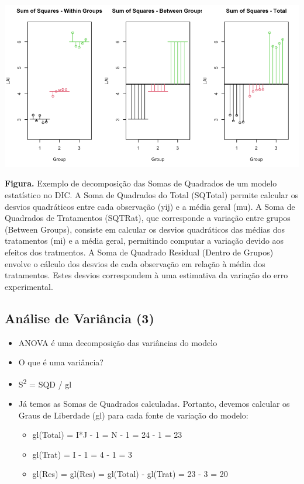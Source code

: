 \documentclass[
]{book}
\providecommand{\tightlist}{%
  \setlength{\itemsep}{0pt}\setlength{\parskip}{0pt}}
\begin{document}
\includegraphics[width=1\linewidth]{imagens/sq_figura}

\textbf{Figura.} Exemplo de decomposição das Somas de Quadrados de um modelo estatístico no DIC. A Soma de Quadrados do Total (SQTotal) permite calcular os desvios quadráticos entre cada observação (yij) e a média geral (mu). A Soma de Quadrados de Tratamentos (SQTRat), que corresponde a variação entre grupos (Between Groups), consiste em calcular os desvios quadráticos das médias dos tratamentos (mi) e a média geral, permitindo computar a variação devido aos efeitos dos tratmentos. A Soma de Quadrado Residual (Dentro de Grupos) envolve o cálculo dos desvios de cada observação em relação à média dos tratamentos. Estes desvios correspondem à uma estimativa da variação do erro experimental.

\subsection{Análise de Variância (3)}\label{anuxe1lise-de-variuxe2ncia-3}

\begin{itemize}
\item
  ANOVA é uma decomposição das variâncias do modelo
\item
  O que é uma variância?
\item
  S\textsuperscript{2} = SQD / gl
\item
  Já temos as Somas de Quadrados calculadas. Portanto, devemos calcular os Graus de Liberdade (gl) para cada fonte de variação do modelo:

  \begin{itemize}
  \tightlist
  \item
    gl(Total) = I*J - 1 = N - 1 = 24 - 1 = 23
  \item
    gl(Trat) = I - 1 = 4 - 1 = 3
  \item
    gl(Res) = gl(Res) = gl(Total) - gl(Trat) = 23 - 3 = 20
  \end{itemize}
\end{itemize}
\end{document}
